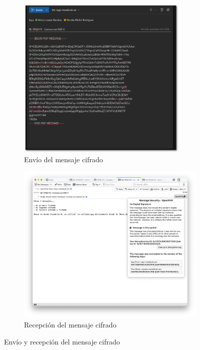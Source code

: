 \begin{figure}[H]
    \centering
    \begin{subfigure}{.5\textwidth}
        \centering
        \includegraphics[width=0.9\textwidth]{outlook-cifrado-sombra.png}
        \caption{Envío del mensaje cifrado}
    \end{subfigure}%
    \begin{subfigure}{.5\textwidth}
        \centering
        \includegraphics[width=\textwidth]{thunderbird-cifrado.png}
        \caption{Recepción del mensaje cifrado}
    \end{subfigure}
    \caption{Envío y recepción del mensaje cifrado}
\end{figure}

